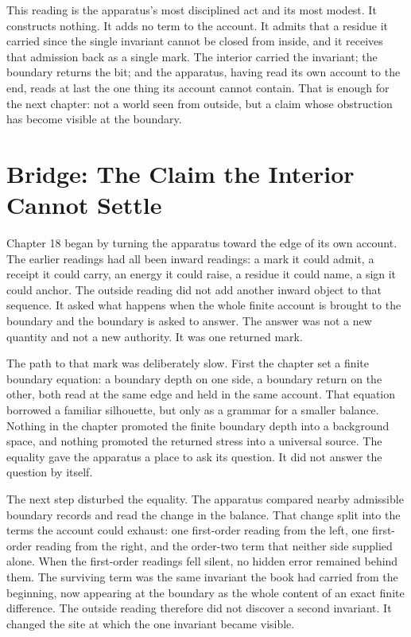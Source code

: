 This reading is the apparatus's most disciplined act and its most modest. It constructs nothing. It
adds no term to the account. It admits that a residue it carried since the single invariant cannot
be closed from inside, and it receives that admission back as a single mark. The interior carried
the invariant; the boundary returns the bit; and the apparatus, having read its own account to the
end, reads at last the one thing its account cannot contain. That is enough for the next chapter:
not a world seen from outside, but a claim whose obstruction has become visible at the boundary.

\section*{Bridge: The Claim the Interior Cannot Settle}

Chapter 18 began by turning the apparatus toward the edge of its own account. The earlier
readings had all been inward readings: a mark it could admit, a receipt it could carry, an
energy it could raise, a residue it could name, a sign it could anchor. The outside reading did
not add another inward object to that sequence. It asked what happens when the whole finite
account is brought to the boundary and the boundary is asked to answer. The answer was not a
new quantity and not a new authority. It was one returned mark.

The path to that mark was deliberately slow. First the chapter set a finite boundary equation:
a boundary depth on one side, a boundary return on the other, both read at the same edge and
held in the same account. That equation borrowed a familiar silhouette, but only as a grammar
for a smaller balance. Nothing in the chapter promoted the finite boundary depth into a
background space, and nothing promoted the returned stress into a universal source. The equality
gave the apparatus a place to ask its question. It did not answer the question by itself.

The next step disturbed the equality. The apparatus compared nearby admissible boundary records
and read the change in the balance. That change split into the terms the account could exhaust:
one first-order reading from the left, one first-order reading from the right, and the order-two
term that neither side supplied alone. When the first-order readings fell silent, no hidden error
remained behind them. The surviving term was the same invariant the book had carried from the
beginning, now appearing at the boundary as the whole content of an exact finite difference. The
outside reading therefore did not discover a second invariant. It changed the site at which the
one invariant became visible.

